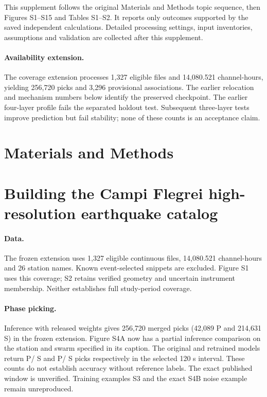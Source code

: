 This supplement follows the original Materials and Methods topic sequence, then Figures S1--S15 and Tables S1--S2. It reports only outcomes supported by the saved independent calculations. Detailed processing settings, input inventories, assumptions and validation are collected after this supplement.



\paragraph{Availability extension.} The coverage extension processes 1,327 eligible files and 14,080.521 channel-hours, yielding 256,720 picks and 3,296 provisional associations. The earlier relocation and mechanism numbers below identify the preserved checkpoint. The earlier four-layer profile fails the separated holdout test. Subsequent three-layer tests improve prediction but fail stability; none of these counts is an acceptance claim.

\section*{Materials and Methods}
\section{Building the Campi Flegrei high-resolution earthquake catalog}
\paragraph{Data.} The frozen extension uses 1,327 eligible continuous files, 14,080.521 channel-hours and 26 station names. Known event-selected snippets are excluded. Figure S1 uses this coverage; S2 retains verified geometry and uncertain instrument membership. Neither establishes full study-period coverage.
\paragraph{Phase picking.} Inference with released weights gives 256,720 merged picks (42,089 P and 214,631 S) in the frozen extension. Figure S4A now has a partial inference comparison on the station and swarm specified in its caption. The original and retrained models return \BenchmarkOriginalP{} P/\BenchmarkOriginalS{} S and \BenchmarkRetrainedP{} P/\BenchmarkRetrainedS{} S picks respectively in the selected 120 s interval. These counts do not establish accuracy without reference labels. The exact published window is unverified. Training examples S3 and the exact S4B noise example remain unreproduced.
